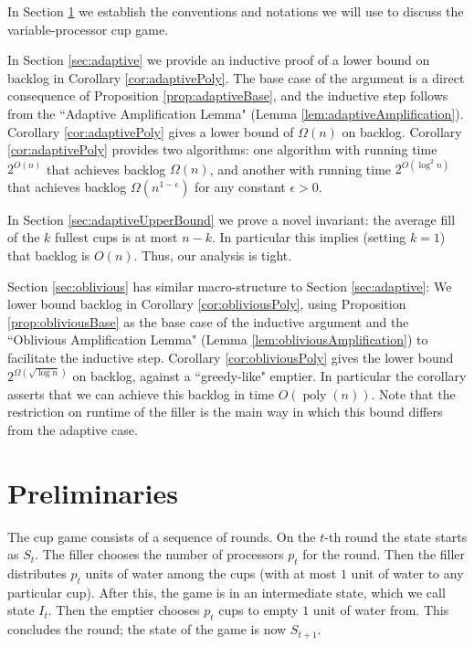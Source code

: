 \documentclass[twocolumn]{article}[10pt]
\renewcommand{\paragraph}[1]{\vspace{0.09in}\noindent{\bf \boldmath #1.}}
\DeclareMathOperator{\poly}{\text{poly}}
\begin{document}
\paragraph{Outline and Results}
In Section \ref{sec:prelims} we establish the conventions and notations we will
use to discuss the variable-processor cup game. 

In Section \ref{sec:adaptive} we provide an inductive
proof of a lower bound on backlog in Corollary \ref{cor:adaptivePoly}.
The base case of the argument is a direct consequence of Proposition
\ref{prop:adaptiveBase}, and the inductive step follows from the ``Adaptive
Amplification Lemma" (Lemma \ref{lem:adaptiveAmplification}). Corollary
\ref{cor:adaptivePoly} gives a lower bound of $\Omega(n)$ on backlog. Corollary
\ref{cor:adaptivePoly} provides two algorithms: one algorithm with running time
$2^{O(n)}$ that achieves backlog $\Omega(n)$, and another with running time
$2^{O(\log^2 n)}$ that achieves backlog $\Omega(n^{1-\epsilon})$ for any
constant $\epsilon > 0$.

In Section \ref{sec:adaptiveUpperBound} we prove a novel invariant: the average
fill of the $k$ fullest cups is at most $n-k$. In particular this implies
(setting $k=1$) that backlog is $O(n)$. Thus, our analysis is tight.

Section \ref{sec:oblivious} has similar macro-structure to Section
\ref{sec:adaptive}: We lower bound backlog in Corollary
\ref{cor:obliviousPoly}, using Proposition \ref{prop:obliviousBase} as the base
case of the inductive argument and the ``Oblivious Amplification Lemma" (Lemma
\ref{lem:obliviousAmplification}) to facilitate the inductive step. Corollary
\ref{cor:obliviousPoly} gives the lower bound $2^{\Omega(\sqrt{\log n})}$ on
backlog, against a ``greedy-like" emptier. In particular the corollary asserts
that we can achieve this backlog in time $O(\poly(n))$. Note that the
restriction on runtime of the filler is the main way in which this bound
differs from the adaptive case.

\section{Preliminaries}\label{sec:prelims}
The cup game consists of a sequence of rounds. On the $t$-th round the state
starts as $S_t$. The filler chooses the number of processors $p_t$ for the round. 
Then the filler distributes $p_t$ units of water among the cups (with at most
$1$ unit of water to any particular cup). After this, the game is in an intermediate
state, which we call state $I_t$. Then the emptier chooses
$p_t$ cups to empty $1$ unit of water from. This concludes the round; the state of the game is now $S_{t+1}$.
\end{document}
